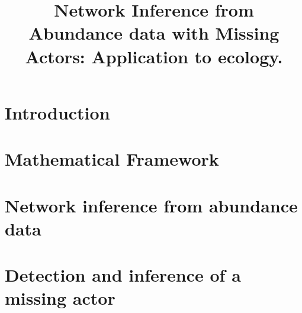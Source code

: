 \documentclass[11pt,a4paper]{book}
\title{Network Inference from Abundance data with Missing Actors: Application to ecology.}
\begin{document}
\maketitle
\tableofcontents
\chapter*{Introduction}


\chapter{Mathematical Framework}

	
	
\chapter{Network inference from abundance data}

	
\chapter{Detection and inference of a missing actor}

\end{document}
